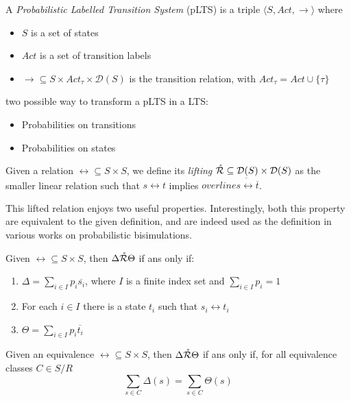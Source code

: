 A \textit{Probabilistic Labelled Transition System} (pLTS) is a triple $\langle S , Act, \rightarrow \rangle$ where \begin{itemize}
\item $S$ is a set of states
\item $Act$ is a set of transition labels
\item $\rightarrow 	\subseteq S\times Act_\tau \times \mathcal{D}(S)$ is the transition relation, with $Act_\tau = Act \cup \{\tau\}$
\end{itemize} 

two possible way to transform a pLTS in a LTS: \begin{itemize}
\item Probabilities on transitions
\item Probabilities on states
\end{itemize}


Given a relation $\rel \subseteq S \times S$, we define its \textit{lifting} $\mathring{\mathcal{R}} \subseteq \mathcal{D}(S) \times \mathcal{D}(S)$ as the smaller linear relation such that $s \rel t$ implies $overline{s} \mathring{\rel} \overline{t}$.



This lifted relation enjoys two useful properties. Interestingly, both this property are equivalent to the given definition, and are indeed used as the definition in various works on probabilistic bisimulations.

Given $\rel \subseteq S \times S$, then $\Delta \mathring{\mathcal{R}} \Theta$ if ans only if: \begin{enumerate}
\item $\Delta = \sum_{i \in I} p_i \overline{s_i}$, where $I$ is a finite index set and $\sum_{i \in I}p_i = 1$
\item For each $i \in I$ there is a state $t_i$ such that $s_i \rel t_i$
\item $\Theta = \sum_{i\in I}p_i\overline{t_i}$ 
\end{enumerate}

Given an equivalence $\rel \subseteq S \times S$, then $\Delta \mathring{\mathcal{R}} \Theta$ if ans only if, for all equivalence classes $C \in S/R$
\[\sum_{s\in C} \Delta(s) = \sum_{s\in C} \Theta(s)\]


